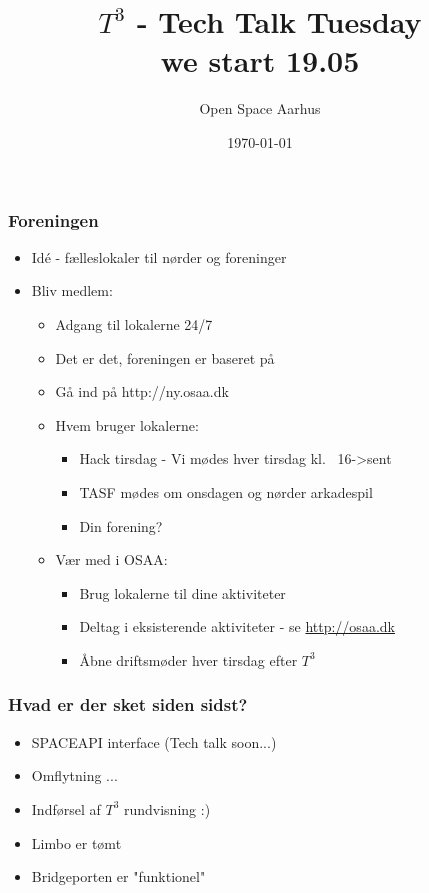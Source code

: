 \documentclass{beamer}
\title[${T^3}$ - Tech Talk Tuesday]{${T^3}$ - Tech Talk Tuesday \\
we start 19.05 }
\author{Open Space Aarhus}
\date{\today}
\institute[Katrinebjergvej 105]{Katrinebjergvej 105, 8200 Aarhus N}
\begin{document}
\begin{frame}[label=titlepage]
  \titlepage
\end{frame}

\begin{frame}
  \frametitle{Foreningen}
  \begin{itemize}
    \item Idé - fælleslokaler til nørder og foreninger
    \item Bliv medlem:
    \begin{itemize}
      \item Adgang til lokalerne 24/7
      \item Det er det, foreningen er baseret på
      \item Gå ind på http://ny.osaa.dk
      \item Hvem bruger lokalerne:
      \begin{itemize}
        \item Hack tirsdag - Vi mødes hver tirsdag kl. ~16->sent
        \item TASF mødes om onsdagen og nørder arkadespil
        \item Din forening?
      \end{itemize}
      \item Vær med i OSAA:
      \begin{itemize}
        \item Brug lokalerne til dine aktiviteter
        \item Deltag i eksisterende aktiviteter - se \url{http://osaa.dk}
        \item Åbne driftsmøder hver tirsdag efter ${T^3}$
      \end{itemize}
    \end{itemize}
  \end{itemize}
\end{frame}


\begin{frame}
  \frametitle{Hvad er der sket siden sidst?}
  \begin{itemize}
  \item SPACEAPI interface (Tech talk soon...)
  \item Omflytning ...
  \item Indførsel af ${T^3}$ rundvisning :)
  \item Limbo er tømt
  \item Bridgeporten er "funktionel"
  \end{itemize}
\end{frame}
\end{document}
